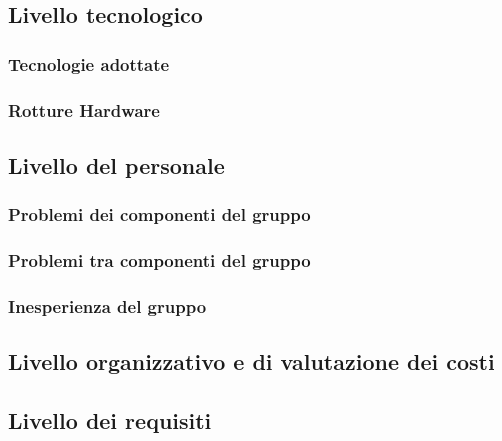 	\subsection{Livello tecnologico}
	\subsubsection{Tecnologie adottate}
	\subsubsection{Rotture Hardware}
	
	\subsection{Livello del personale}
	\subsubsection{Problemi dei componenti del gruppo}
	\subsubsection{Problemi tra componenti del gruppo}
	\subsubsection{Inesperienza del gruppo}
	
	\subsection{Livello organizzativo e di valutazione dei costi}
	\subsection{Livello dei requisiti}
